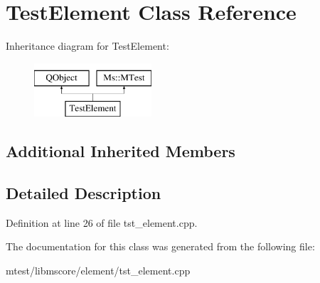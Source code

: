 \hypertarget{class_test_element}{}\section{Test\+Element Class Reference}
\label{class_test_element}
Inheritance diagram for Test\+Element\+:\begin{figure}[H]
\begin{center}
\leavevmode
\includegraphics[height=2.000000cm]{class_test_element}
\end{center}
\end{figure}
\subsection*{Additional Inherited Members}


\subsection{Detailed Description}


Definition at line 26 of file tst\+\_\+element.\+cpp.



The documentation for this class was generated from the following file\+:\begin{DoxyCompactItemize}
\item 
mtest/libmscore/element/tst\+\_\+element.\+cpp\end{DoxyCompactItemize}
